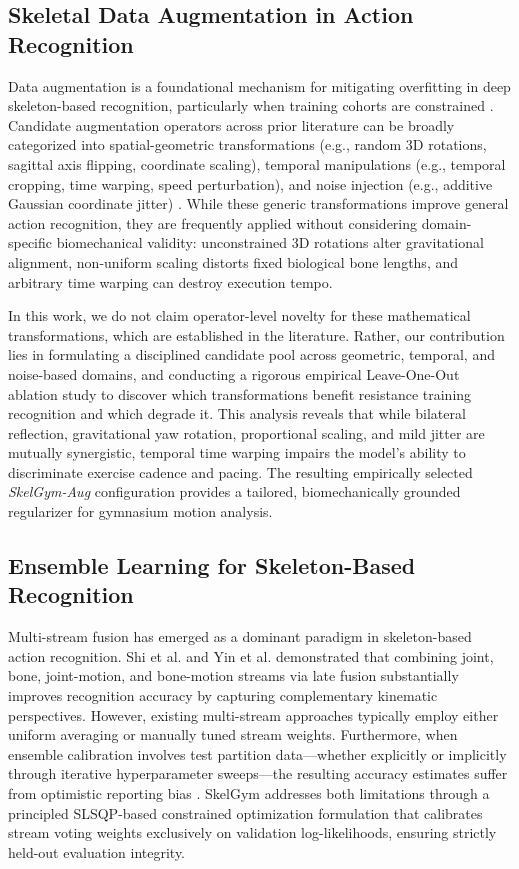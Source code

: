 \documentclass[runningheads]{llncs}
\begin{document}
\subsection{Skeletal Data Augmentation in Action Recognition}
Data augmentation is a foundational mechanism for mitigating overfitting in deep skeleton-based recognition, particularly when training cohorts are constrained \cite{yan2018,shi2020skeleton}. Candidate augmentation operators across prior literature can be broadly categorized into spatial-geometric transformations (e.g., random 3D rotations, sagittal axis flipping, coordinate scaling), temporal manipulations (e.g., temporal cropping, time warping, speed perturbation), and noise injection (e.g., additive Gaussian coordinate jitter) \cite{xin2024augmentation}. While these generic transformations improve general action recognition, they are frequently applied without considering domain-specific biomechanical validity: unconstrained 3D rotations alter gravitational alignment, non-uniform scaling distorts fixed biological bone lengths, and arbitrary time warping can destroy execution tempo.

In this work, we do not claim operator-level novelty for these mathematical transformations, which are established in the literature. Rather, our contribution lies in formulating a disciplined candidate pool across geometric, temporal, and noise-based domains, and conducting a rigorous empirical Leave-One-Out ablation study to discover which transformations benefit resistance training recognition and which degrade it. This analysis reveals that while bilateral reflection, gravitational yaw rotation, proportional scaling, and mild jitter are mutually synergistic, temporal time warping impairs the model's ability to discriminate exercise cadence and pacing. The resulting empirically selected \textit{SkelGym-Aug} configuration provides a tailored, biomechanically grounded regularizer for gymnasium motion analysis.

\subsection{Ensemble Learning for Skeleton-Based Recognition}
Multi-stream fusion has emerged as a dominant paradigm in skeleton-based action recognition. Shi et al. \cite{shi2020skeleton} and Yin et al. \cite{yin2023} demonstrated that combining joint, bone, joint-motion, and bone-motion streams via late fusion substantially improves recognition accuracy by capturing complementary kinematic perspectives. However, existing multi-stream approaches typically employ either uniform averaging or manually tuned stream weights. Furthermore, when ensemble calibration involves test partition data---whether explicitly or implicitly through iterative hyperparameter sweeps---the resulting accuracy estimates suffer from optimistic reporting bias \cite{wolpert1992stacking}. SkelGym addresses both limitations through a principled SLSQP-based constrained optimization formulation \cite{kraft1988,virtanen2020} that calibrates stream voting weights exclusively on validation log-likelihoods, ensuring strictly held-out evaluation integrity.
\end{document}
